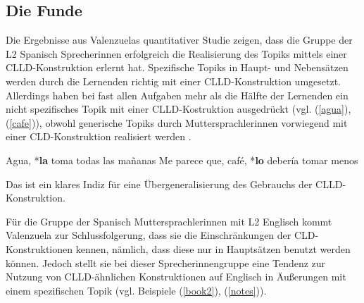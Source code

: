 
\subsection{Die Funde}

Die Ergebnisse aus Valenzuelas quantitativer Studie zeigen, dass die Gruppe der L2 Spanisch Sprecherinnen erfolgreich die Realisierung des Topiks mittels einer CLLD-Konstruktion erlernt hat.
Spezifische Topiks in Haupt- und Nebensätzen werden durch die Lernenden richtig mit einer CLLD-Konstruktion umgesetzt.
Allerdings haben bei fast allen Aufgaben mehr als die Hälfte der Lernenden ein nicht spezifisches Topik mit einer CLLD-Kostruktion ausgedrückt (vgl. (\ref{agua}), (\ref{cafe})),
obwohl generische Topiks durch Muttersprachlerinnen vorwiegend mit einer CLD-Konstruktion realisiert werden \cite{Valenzuela05}.

\begin{exe}
    \ex \label{agua} Agua, *\textbf{la} toma todas las mañanas
    \ex \label{cafe}Me parece que, café, *\textbf{lo} debería tomar menos
\end{exe}

Das ist ein klares Indiz für eine Übergeneralisierung des Gebrauchs der CLLD-Konstruktion.

Für die Gruppe der Spanisch Muttersprachlerinnen mit L2 Englisch kommt Valenzuela zur Schlussfolgerung,
dass sie die Einschränkungen der CLD-Konstruktionen kennen, nämlich, dass diese nur in Hauptsätzen benutzt werden können.
Jedoch stellt sie bei dieser Sprecherinnengruppe eine Tendenz zur Nutzung von CLLD-ähnlichen Konstruktionen auf Englisch in Äußerungen mit einem spezifischen Topik (vgl. Beispiele (\ref{book2}), (\ref{notes})).


